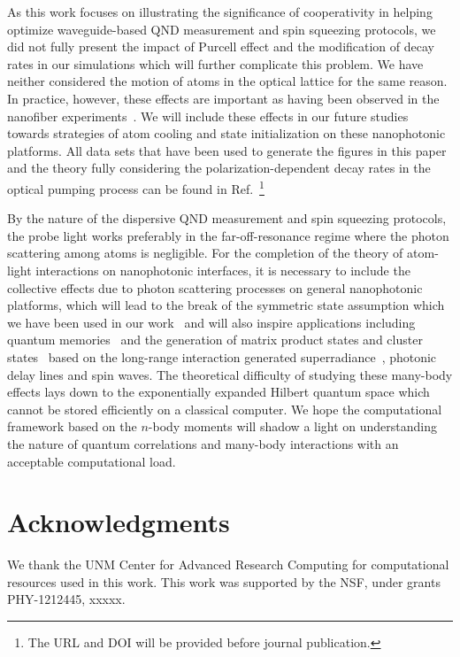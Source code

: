 \documentclass[aps,pra,twocolumn,superscriptaddress]{revtex4-1} %
\begin{document}
As this work focuses on illustrating the significance of cooperativity in helping optimize waveguide-based QND measurement and spin squeezing protocols, we did not fully present the impact of Purcell effect and the modification of decay rates in our simulations which will further complicate this problem. We have neither considered the motion of atoms in the optical lattice for the same reason. In practice, however, these effects are important as having been observed in the nanofiber experiments~\cite{Solano2017Dynamics,Solano2017Alignment,Beguin2017Observation,Solano2017Optical}. We will include these effects in our future studies towards strategies of atom cooling and state initialization on these nanophotonic platforms. All data sets that have been used to generate the figures in this paper and the theory fully considering the polarization-dependent decay rates in the optical pumping process can be found in Ref.~\footnote{The URL and DOI will be provided before journal publication.}

By the nature of the dispersive QND measurement and spin squeezing protocols, the probe light works preferably in the far-off-resonance regime where the photon scattering among atoms is negligible. For the completion of the theory of atom-light interactions on nanophotonic interfaces, it is necessary to include the collective effects due to photon scattering processes on general nanophotonic platforms, which will lead to the break of the symmetric state assumption which we have been used in our work~\cite{Qi2016} and will also inspire applications including quantum memories~\cite{Asenjo-Garcia2017Exponential,Asenjo-Garcia2017Atom} and the generation of matrix product states and cluster states~\cite{Economou2010,Lodahl2017Chiral,Schwartz2016Deterministic,Pichler2016Photonic,Pichler2017Photonic} based on the long-range interaction generated superradiance~\cite{Solano2017Super}, photonic delay lines and spin waves. The theoretical difficulty of studying these many-body effects lays down to the exponentially expanded Hilbert quantum space which cannot be stored efficiently on a classical computer. We hope the computational framework based on the $ n $-body moments will shadow a light on understanding the nature of quantum correlations and many-body interactions with an acceptable computational load.

\section{Acknowledgments}
We thank the UNM Center for Advanced Research Computing for computational resources used in this work.
This work was supported by the NSF, under grants PHY-1212445, xxxxx.
\end{document}
